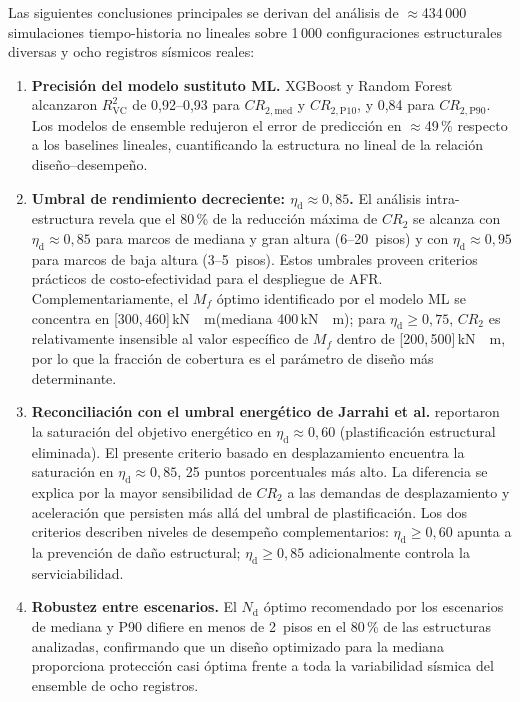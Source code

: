 \documentclass[preprint,12pt,authoryear]{elsarticle}
\newcommand{\CR}[1]{CR_{2,\text{#1}}}
\newcommand{\Rsq}{R^{2}_{\mathrm{VC}}}
\newcommand{\nd}{N_{\mathrm{d}}}
\newcommand{\etad}{\eta_{\mathrm{d}}}
\newcommand{\Mf}{M_{\!f}}
\newcommand{\KM}{\,\si{kN{\cdot}m}}
\begin{document}
Las siguientes conclusiones principales se derivan del análisis de
$\approx$434\,000 simulaciones tiempo-historia no lineales sobre 1\,000
configuraciones estructurales diversas y ocho registros sísmicos reales:

\begin{enumerate}

\item \textbf{Precisión del modelo sustituto ML.}
XGBoost y Random Forest alcanzaron $\Rsq$ de 0{,}92--0{,}93 para $\CR{med}$ y
$\CR{P10}$, y 0{,}84 para $\CR{P90}$. Los modelos de ensemble redujeron el error
de predicción en $\approx$49\,\% respecto a los baselines lineales, cuantificando
la estructura no lineal de la relación diseño--desempeño.

\item \textbf{Umbral de rendimiento decreciente: $\etad \approx 0{,}85$.}
El análisis intra-estructura revela que el 80\,\% de la reducción máxima de
$CR_2$ se alcanza con $\etad \approx 0{,}85$ para marcos de mediana y gran
altura (6--20~pisos) y con $\etad \approx 0{,}95$ para marcos de baja altura
(3--5~pisos). Estos umbrales proveen criterios prácticos de costo-efectividad
para el despliegue de AFR. Complementariamente, el $\Mf$ óptimo identificado
por el modelo ML se concentra en [300,\,460]\KM (mediana 400\KM); para
$\etad \geq 0{,}75$, $CR_2$ es relativamente insensible al valor específico
de $\Mf$ dentro de [200,\,500]\KM, por lo que la fracción de cobertura es
el parámetro de diseño más determinante.

\item \textbf{Reconciliación con el umbral energético de Jarrahi et al.}
\citet{Jarrahi2020sdee} reportaron la saturación del objetivo energético en
$\etad \approx 0{,}60$ (plastificación estructural eliminada). El presente
criterio basado en desplazamiento encuentra la saturación en $\etad \approx
0{,}85$, 25 puntos porcentuales más alto. La diferencia se explica por la mayor
sensibilidad de $CR_2$ a las demandas de desplazamiento y aceleración que
persisten más allá del umbral de plastificación. Los dos criterios describen
niveles de desempeño complementarios: $\etad \geq 0{,}60$ apunta a la
prevención de daño estructural; $\etad \geq 0{,}85$ adicionalmente controla
la serviciabilidad.

\item \textbf{Robustez entre escenarios.}
El $\nd$ óptimo recomendado por los escenarios de mediana y P90 difiere en menos
de 2~pisos en el 80\,\% de las estructuras analizadas, confirmando que un diseño
optimizado para la mediana proporciona protección casi óptima frente a toda la
variabilidad sísmica del ensemble de ocho registros.


\end{enumerate}
\end{document}
